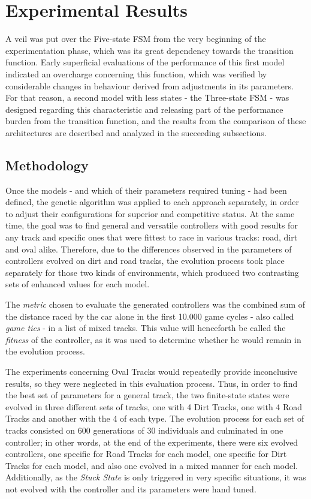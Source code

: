 \section{Experimental Results} \label{sec:Experiments}

	A veil was put over the Five-state FSM from the very beginning of the experimentation phase, which was its great dependency towards the transition function. Early superficial evaluations of the performance of this first model indicated an overcharge concerning this function, which was verified by considerable changes in behaviour derived from adjustments in its parameters. For that reason, a second model with less states - the Three-state FSM - was designed regarding this characteristic and releasing part of the performance burden from the transition function, and the results from the comparison of these architectures are described and analyzed in the succeeding subsections.

\subsection{Methodology} \label{subsec:Methodology}

	Once the models - and which of their parameters required tuning - had been defined, the genetic algorithm was applied to each approach separately, in order to adjust their configurations for superior and competitive status. At the same time, the goal was to find general and versatile controllers with good results for any track and specific ones that were fittest to race in various tracks: road, dirt and oval alike. Therefore, due to the differences observed in the parameters of controllers evolved on dirt and road tracks, the evolution process took place separately for those two kinds of environments, which produced two contrasting sets of enhanced values for each model.
	
	The \emph{metric} chosen to evaluate the generated controllers was the combined sum of the distance raced by the car alone in the first 10.000 game cycles - also called \emph{game tics} - in a list of mixed tracks. This value will henceforth be called the \emph{fitness} of the controller, as it was used to determine whether he would remain in the evolution process.
	
	The experiments concerning Oval Tracks would repeatedly provide inconclusive results, so they were neglected in this evaluation process. Thus, in order to find the best set of parameters for a general track, the two finite-state states were evolved in three different sets of tracks, one with 4 Dirt Tracks, one with 4 Road Tracks and another with the 4 of each type. The evolution process for each set of tracks consisted on 600 generations of 30 individuals and culminated in one controller; in other words, at the end of the experiments, there were six evolved controllers, one specific for Road Tracks for each model, one specific for Dirt Tracks for each model, and also one evolved in a mixed manner for each model. Additionally, as the \emph{Stuck State} is only triggered in very specific situations, it was not evolved with the controller and its parameters were hand tuned.
	
